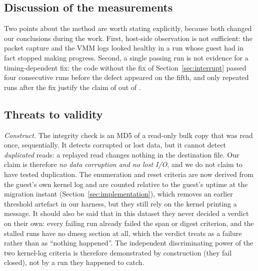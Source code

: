 \documentclass[10pt,conference]{IEEEtran}
\begin{document}
\subsection{Discussion of the measurements}
Two points about the method are worth stating explicitly, because both changed
our conclusions during the work. First, host-side observation is not
sufficient: the packet capture and the VMM logs looked healthy in a run whose
guest had in fact stopped making progress. Second, a single passing run is not
evidence for a timing-dependent fix: the code without the fix of Section~\ref{sec:interrupt} passed four consecutive runs before the defect appeared on the fifth, and only repeated
runs after the fix justify the claim of \PassCount{} out of \TotalRuns{}.

\subsection{Threats to validity}
\label{sec:threats}
\emph{Construct.} The integrity check is an MD5 of a read-only bulk copy that
was read once, sequentially. It detects corrupted or lost data, but it cannot
detect \emph{duplicated} reads: a replayed read changes nothing in the
destination file. Our claim is therefore \emph{no data corruption and no lost
I/O}, and we do not claim to have tested duplication. The enumeration and
reset criteria are now derived from the guest's own kernel log and are counted
relative to the guest's uptime at the migration instant
(Section~\ref{sec:implementation}), which removes an earlier threshold artefact
in our harness, but they still rely on the kernel printing a message. It should
also be said that in this dataset they never decided a verdict on their own:
every failing run already failed the span or digest criterion, and the stalled
runs have no dmesg section at all, which the verdict treats as a failure rather
than as ``nothing happened''. The independent discriminating power of the two
kernel-log criteria is therefore demonstrated by construction (they fail
closed), not by a run they happened to catch.
\end{document}
